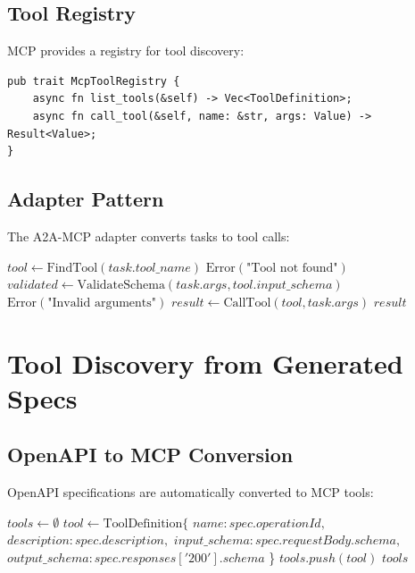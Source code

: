 \subsection{Tool Registry}

MCP provides a registry for tool discovery:

\begin{verbatim}
pub trait McpToolRegistry {
    async fn list_tools(&self) -> Vec<ToolDefinition>;
    async fn call_tool(&self, name: &str, args: Value) -> Result<Value>;
}
\end{verbatim}

\subsection{Adapter Pattern}

The A2A-MCP adapter converts tasks to tool calls:

\begin{algorithm}
\caption{A2A to MCP Adaptation}
\begin{algorithmic}[1]
    \State $tool \gets \text{FindTool}(task.tool\_name)$
        \State \Return $\text{Error}(\text{"Tool not found"})$
    \EndIf
    \State $validated \gets \text{ValidateSchema}(task.args, tool.input\_schema)$
        \State \Return $\text{Error}(\text{"Invalid arguments"})$
    \EndIf
    \State $result \gets \text{CallTool}(tool, task.args)$
    \State \Return $result$
\EndProcedure
\end{algorithmic}
\end{algorithm}

\section{Tool Discovery from Generated Specs}

\subsection{OpenAPI to MCP Conversion}

OpenAPI specifications are automatically converted to MCP tools:

\begin{algorithm}
\caption{Tool Discovery}
\begin{algorithmic}[1]
    \State $tools \gets \emptyset$
            \State $tool \gets \text{ToolDefinition} \{$
                \State \quad $name: spec.operationId,$
                \State \quad $description: spec.description,$
                \State \quad $input\_schema: spec.requestBody.schema,$
                \State \quad $output\_schema: spec.responses['200'].schema$
            \State \}
            \State $tools.push(tool)$
        \EndFor
    \EndFor
    \State \Return $tools$
\EndProcedure
\end{algorithmic}
\end{algorithm}

